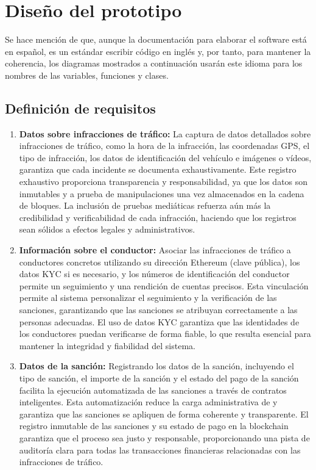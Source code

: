 \section{Diseño del prototipo}
Se hace mención de que, aunque la documentación para elaborar el software está en español, es un estándar escribir código en inglés y, por tanto, para mantener la coherencia, los diagramas mostrados a continuación usarán este idioma para los nombres de las variables, funciones y clases.
\subsection{Definición de requisitos}
    
\begin{enumerate}
    \item \textbf{Datos sobre infracciones de tráfico:} La captura de datos detallados sobre infracciones de tráfico, como la hora de la infracción, las coordenadas GPS, el tipo de infracción, los datos de identificación del vehículo e imágenes o vídeos, garantiza que cada incidente se documenta exhaustivamente. Este registro exhaustivo proporciona transparencia y responsabilidad, ya que los datos son inmutables y a prueba de manipulaciones una vez almacenados en la cadena de bloques. La inclusión de pruebas mediáticas refuerza aún más la credibilidad y verificabilidad de cada infracción, haciendo que los registros sean sólidos a efectos legales y administrativos. 
    \item \textbf{Información sobre el conductor:} Asociar las infracciones de tráfico a conductores concretos utilizando su dirección Ethereum (clave pública), los datos KYC si es necesario, y los números de identificación del conductor permite un seguimiento y una rendición de cuentas precisos. Esta vinculación permite al sistema personalizar el seguimiento y la verificación de las sanciones, garantizando que las sanciones se atribuyan correctamente a las personas adecuadas. El uso de datos KYC garantiza que las identidades de los conductores puedan verificarse de forma fiable, lo que resulta esencial para mantener la integridad y fiabilidad del sistema.
    \item \textbf{Datos de la sanción: }  Registrando los datos de la sanción, incluyendo el tipo de sanción, el importe de la sanción y el estado del pago de la sanción facilita la ejecución automatizada de las sanciones a través de contratos inteligentes. Esta automatización reduce la carga administrativa de y garantiza que las sanciones se apliquen de forma coherente y transparente. El registro inmutable de las sanciones y su estado de pago en la blockchain garantiza que el proceso sea justo y responsable, proporcionando una pista de auditoría clara para todas las transacciones financieras relacionadas con las infracciones de tráfico.

\end{enumerate}
